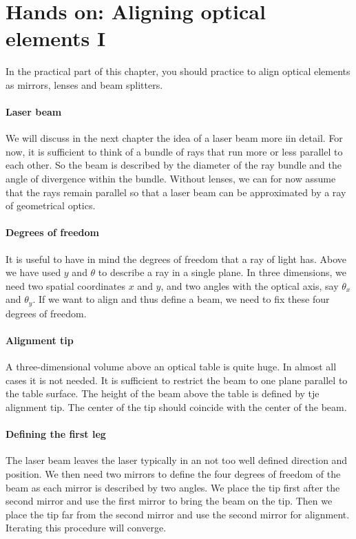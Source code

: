 \section {Hands on: Aligning optical elements I}

In the practical part of this chapter, you should practice to align optical elements as mirrors, lenses and beam splitters.

\paragraph*{Laser beam} We will discuss in the next chapter the idea of a laser beam more iin detail. For now, it is sufficient to think of a bundle of rays that run more or less parallel to each other. So the beam is described by the diameter of the ray bundle and the angle of divergence within the bundle. Without lenses, we can for now assume that the rays remain parallel so that a laser beam can be approximated by a ray of geometrical optics.

\paragraph*{Degrees of freedom} It is useful to have in mind the degrees of freedom that a ray of light has. Above we have used $y$ and $\theta$ to describe a ray in a single plane. In three dimensions, we need two spatial coordinates $x$ and $y$, and two angles with the optical axis, say $\theta_x$ and $\theta_y$. If we want to align and thus define a beam, we need to fix these four degrees of freedom.

\paragraph*{Alignment tip} A three-dimensional volume above an optical table is quite huge. In almost all cases it is not needed. It is sufficient to restrict the beam to one plane parallel to the table surface. The height of the beam above the table is defined by tje alignment tip. The center of the tip should coincide with the center of the beam.

\paragraph*{Defining the first leg} The laser beam leaves the laser typically in an not too well defined direction and position. We then need two mirrors to define the four degrees of freedom of the beam as each mirror is described by two angles. We place the tip first after the second mirror and use the first mirror to bring the beam on the tip. Then we place the tip far from the second mirror and use the second mirror for alignment. Iterating this procedure will converge.

